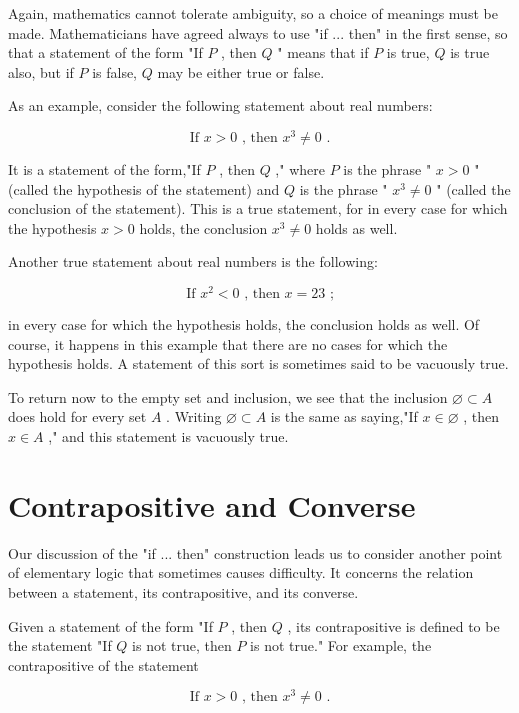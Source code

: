 Again, mathematics cannot tolerate ambiguity, so a choice of meanings must be made. Mathematicians have agreed always to use "if ... then" in the first sense, so that a statement of the form "If \(P\) , then \(Q\) " means that if \(P\) is true, \(Q\) is true also, but if \(P\) is false, \(Q\) may be either true or false.

As an example, consider the following statement about real numbers:

\[
\text{ If }x > 0\text{ , then }{x}^{3} \neq  0\text{ . }
\]

It is a statement of the form,"If \(P\) , then \(Q\) ," where \(P\) is the phrase " \(x > 0\) " (called the hypothesis of the statement) and \(Q\) is the phrase " \({x}^{3} \neq  0\) " (called the conclusion of the statement). This is a true statement, for in every case for which the hypothesis \(x > 0\) holds, the conclusion \({x}^{3} \neq  0\) holds as well.

Another true statement about real numbers is the following:

\[
\text{ If }{x}^{2} < 0\text{ , then }x = {23}\text{ ; }
\]

in every case for which the hypothesis holds, the conclusion holds as well. Of course, it happens in this example that there are no cases for which the hypothesis holds. A statement of this sort is sometimes said to be vacuously true.

To return now to the empty set and inclusion, we see that the inclusion \(\varnothing  \subset  A\) does hold for every set \(A\) . Writing \(\varnothing  \subset  A\) is the same as saying,"If \(x \in  \varnothing\) , then \(x \in  A\) ," and this statement is vacuously true.

\section*{Contrapositive and Converse}

Our discussion of the "if ... then" construction leads us to consider another point of elementary logic that sometimes causes difficulty. It concerns the relation between a statement, its contrapositive, and its converse.

Given a statement of the form "If \(P\) , then \(Q\) , its contrapositive is defined to be the statement "If \(Q\) is not true, then \(P\) is not true." For example, the contrapositive of the statement

\[
\text{ If }x > 0\text{ , then }{x}^{3} \neq  0\text{ . }
\]

